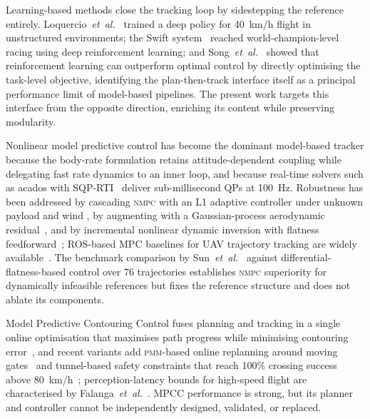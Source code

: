 \documentclass{ieeeaccess}
\newcommand{\pmm}{\textsc{pmm}}
\newcommand{\nmpc}{\textsc{nmpc}}
\begin{document}
Learning-based methods close the tracking loop by sidestepping the
reference entirely.
Loquercio~\textit{et~al.}~\cite{loquercio2021learning} trained a deep
policy for 40~km/h flight in unstructured environments; the Swift
system~\cite{kaufmann2023champion} reached world-champion-level racing
using deep reinforcement learning; and
Song~\textit{et~al.}~\cite{song2023reaching} showed that reinforcement
learning can outperform optimal control by directly optimising the
task-level objective, identifying the plan-then-track interface itself
as a principal performance limit of model-based pipelines.
The present work targets this interface from the opposite direction,
enriching its content while preserving modularity.

Nonlinear model predictive control has become the dominant model-based
tracker because the body-rate formulation
\cite{hanover2021performance} retains attitude-dependent coupling while
delegating fast rate dynamics to an inner loop, and because real-time
solvers such as acados with
SQP-RTI~\cite{verschueren2022acados,diehl2005real} deliver
sub-millisecond QPs at 100~Hz.
Robustness has been addressed by cascading \nmpc{} with an L1 adaptive
controller under unknown payload and wind
\cite{hanover2021performance}, by augmenting with a Gaussian-process
aerodynamic residual~\cite{torrente2021datadriven}, and by incremental
nonlinear dynamic inversion with flatness
feedforward~\cite{tal2021accurate}; ROS-based MPC baselines for UAV
trajectory tracking are widely available~\cite{kamel2017model}.
The benchmark comparison by Sun~\textit{et~al.}~\cite{sun2022comparative}
against differential-flatness-based control over 76 trajectories
establishes \nmpc{} superiority for dynamically infeasible references
but fixes the reference structure and does not ablate its components.

Model Predictive Contouring Control fuses planning and tracking in a
single online optimisation that maximises path progress while
minimising contouring error~\cite{romero2022mpcc}, and recent variants
add \pmm{}-based online replanning around moving
gates~\cite{romero2022replanning} and tunnel-based safety constraints
that reach 100\% crossing success above
80~km/h~\cite{krinner2024mpcc}; perception-latency bounds for
high-speed flight are characterised by
Falanga~\textit{et~al.}~\cite{falanga2018how}.
MPCC performance is strong, but its planner and controller cannot be
independently designed, validated, or replaced.
\end{document}
